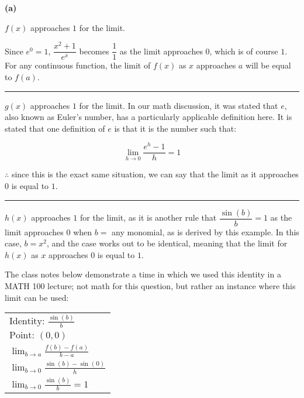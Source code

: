 \documentclass[answers,addpoints]{exam}
\begin{document}
\begin{questions}
\begin{solution}

      \textbf{(a)}

      $f(x)$ approaches $1$ for the limit.

      Since $e^{0}=1$, $\dfrac{x^2 + 1}{e^x}$ becomes $\dfrac{1}{1}$ as the limit approaches $0$, which is of course $1$. For any continuous function, the limit of $f(x)$ as $x$ approaches $a$ will be equal to $f(a)$.

      \hrule

      $g(x)$ approaches $1$ for the limit. In our math discussion, it was stated that $e$, also known as Euler’s number, has a particularly applicable definition here. It is stated that one definition of $e$ is that it is the number such that:

      \[ \lim_{h \to 0} \frac{e^h-1}{h} = 1 \]

      $\therefore$ since this is the exact same situation, we can say that the limit as it approaches $0$ is equal to $1$.

      \hrule

      $h(x)$ approaches $1$ for the limit, as it is another rule that $\dfrac{\sin(b)}{b} = 1$ as the limit approaches $0$ when $b=$ any monomial, as is derived by this example. In this case, $b = x^2$, and the case works out to be identical, meaning that the limit for $h(x)$ as $x$ approaches $0$ is equal to $1$.

      The class notes below demonstrate a time in which we used this identity in a MATH 100 lecture; not math for this question, but rather an instance where this limit can be used:

      \begin{center}
        \begin{tabular}{@{}l@{}}
          $\displaystyle \text{Identity: }\frac{\sin(b)}{b}$ \\[6pt]
          $\displaystyle \text{Point: }(0,0)$ \\[6pt]
          $\displaystyle \lim_{b \to a}\frac{f(b)-f(a)}{b-a}$ \\[6pt]
          $\displaystyle \lim_{b \to 0}\frac{\sin(b)-\sin(0)}{h}$ \\[6pt]
          $\displaystyle \lim_{b \to 0}\frac{\sin(b)}{b}=1$
        \end{tabular}
      \end{center}


\end{solution}
\end{questions}
\end{document}
